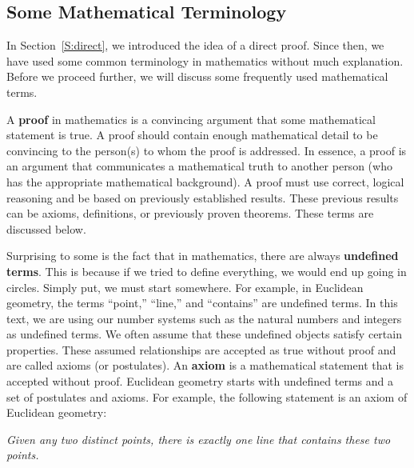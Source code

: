 \subsection*{Some Mathematical Terminology}
In Section~\ref{S:direct}, we introduced the idea of a direct proof.  Since then, we have used some common terminology in mathematics without much explanation.  Before we proceed further, we will discuss some frequently used mathematical terms.

A \textbf{proof}
\label{proof}%
%
 in mathematics is a convincing argument that some mathematical statement is true.  A proof should contain enough mathematical detail to be convincing to the person(s) to whom the proof is addressed.  In essence, a proof is an argument that communicates a mathematical truth to another person (who has the appropriate mathematical background).  A proof must use correct, logical reasoning and be based on previously established results.  These previous results can be axioms, definitions, or previously proven theorems.  These terms are discussed below.

Surprising to some is the fact that in mathematics, there are always \textbf{undefined terms}.
\label{undefined}%
%
  This is because if we tried to define everything, we would end up going in circles.  Simply put, we must start somewhere.  For example, in Euclidean geometry, the terms ``point,'' ``line,'' and ``contains'' are undefined terms.  In this text, we are using our number systems such as the natural numbers and integers as undefined terms.  We often assume that these undefined objects satisfy certain properties.  These assumed relationships are accepted as true without proof and are called axioms (or postulates).  An \textbf{axiom} 
\label{axiom}%
%
 is a mathematical statement that is accepted without proof.  Euclidean geometry starts with undefined terms and a set of postulates and axioms.  For example, the following statement is an axiom of Euclidean geometry:

\newpar
\setlength{\hangindent}{20pt}
\indent
\emph{Given any two distinct points, there is exactly one line that contains these two points.}


\begin{center}
\end{center}


